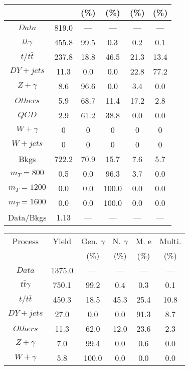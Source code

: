 \begin{figure}
\begin{minipage}[c]{0.32\textwidth}
{\begin{tabular}{cccccc}
 &  & (\%) & (\%) & (\%) & (\%)  \\
\hline
                                                                      $ Data $ &  819.0 &  --- &  --- &  --- &  ---\\
$ t\bar{t}\gamma $ &  455.8 &  99.5 &  0.3 &  0.2 &  0.1\\
$ t/t\bar{t} $ &  237.8 &  18.8 &  46.5 &  21.3 &  13.4\\
$ DY+jets $ &  11.3 &  0.0 &  0.0 &  22.8 &  77.2\\
$ Z+\gamma $ &  8.6 &  96.6 &  0.0 &  3.4 &  0.0\\
$ Others $ &  5.9 &  68.7 &  11.4 &  17.2 &  2.8\\
$ QCD $ &  2.9 &  61.2 &  38.8 &  0.0 &  0.0\\
$ W+\gamma $ &  0 &  0 &  0 &  0 &  0\\
$ W+jets $ &  0 &  0 &  0 &  0 &  0\\
Bkgs &  722.2 &  70.9 &  15.7 &  7.6 &  5.7\\
$ m_{T} = 800 $ &  0.5 &  0.0 &  96.3 &  3.7 &  0.0\\
$ m_{T} = 1200 $ &  0.0 &  0.0 &  100.0 &  0.0 &  0.0\\
$ m_{T} = 1600 $ &  0.0 &  0.0 &  100.0 &  0.0 &  0.0\\
Data/Bkgs &  1.13 &  --- &  --- &  --- &  ---\\
\hline
\end{tabular}
}
\end{minipage}
\begin{minipage}[c]{0.32\textwidth}
\centering
\tiny{
\begin{tabular}{cccccc}
\hline
Process & Yield & Gen. $\gamma$ & N. $\gamma$ & M. e & Multi. \\
 &  & (\%) & (\%) & (\%) & (\%)  \\
\hline
                                                                      $ Data $ &  1375.0 &  --- &  --- &  --- &  ---\\
$ t\bar{t}\gamma $ &  750.1 &  99.2 &  0.4 &  0.3 &  0.1\\
$ t/t\bar{t} $ &  450.3 &  18.5 &  45.3 &  25.4 &  10.8\\
$ DY+jets $ &  27.0 &  0.0 &  0.0 &  91.3 &  8.7\\
$ Others $ &  11.3 &  62.0 &  12.0 &  23.6 &  2.3\\
$ Z+\gamma $ &  7.0 &  99.4 &  0.0 &  0.6 &  0.0\\
$ W+\gamma $ &  5.8 &  100.0 &  0.0 &  0.0 &  0.0\\

\end{tabular}}
\end{minipage}
\end{figure}
